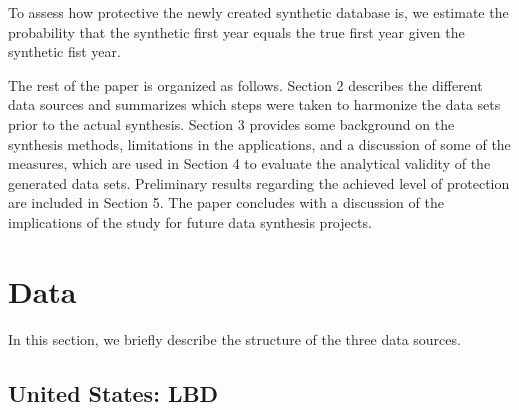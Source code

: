 \documentclass[10pt]{article}
\begin{document}
To assess how protective the newly created synthetic database is, we estimate the probability that the synthetic first year equals the true first year given the synthetic fist year.



The rest of the paper is organized as follows. Section 2 describes the different data sources and summarizes which steps were taken to harmonize the data sets prior to the actual synthesis. Section 3 provides some background on the synthesis methods, limitations in the applications, and a discussion of some of the measures, which are used in Section 4 to evaluate the analytical validity of the generated data sets. Preliminary results regarding the achieved level of protection are included in Section 5. The paper concludes with a discussion of the implications of the study for future data synthesis projects.
 \newpage
\section{Data} 
\label{sec:data}

In this section, we briefly describe the structure of the three data sources.

\subsection{United States: \acf{LBD}}
\end{document}
